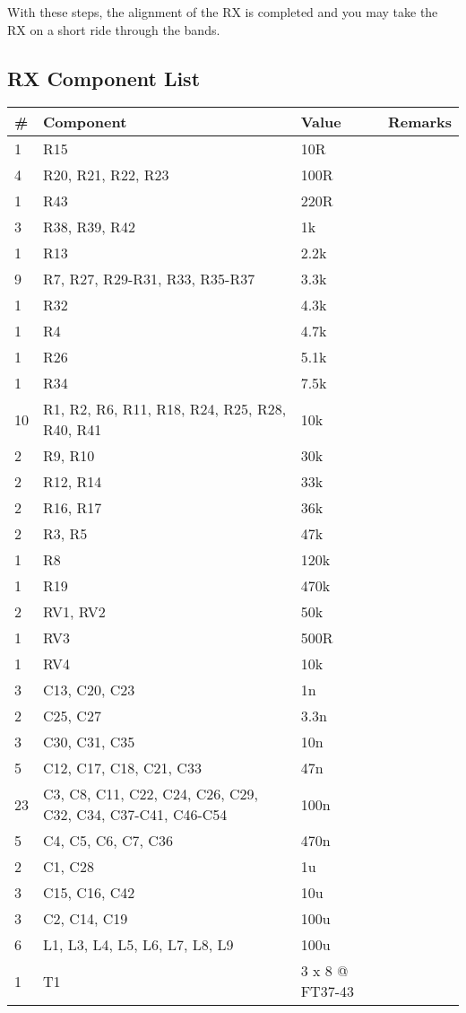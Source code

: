 \documentclass[10pt, a4paper]{scrartcl}
\begin{document}
With these steps, the alignment of the RX is completed and you may take the RX on a short ride through the bands.


\subsection{RX Component List}  \label{sec:rxcomp}
\begin{longtable}{|l|p{6cm}|l|l|} \hline 
\# & Component & Value & Remarks \\ \hline 
1 & R15 & 10R & \\
4 & R20, R21, R22, R23 & 100R & \\
1 & R43 & 220R & \\
3 & R38, R39, R42 & 1k & \\
1 & R13 & 2.2k & \\
9 & R7, R27, R29-R31, R33, R35-R37 & 3.3k & \\
1 & R32 & 4.3k & \\
1 & R4 & 4.7k & \\
1 & R26 & 5.1k & \\
1 & R34 & 7.5k & \\
10 & R1, R2, R6, R11, R18, R24, R25, R28, R40, R41 & 10k & \\
2 & R9, R10 & 30k & \\
2 & R12, R14 & 33k & \\
2 & R16, R17 & 36k & \\
2 & R3, R5 & 47k & \\
1 & R8 & 120k & \\
1 & R19 & 470k & \\
2 & RV1, RV2 & 50k & \\
1 & RV3 & 500R & \\
1 & RV4 & 10k & \\
3 & C13, C20, C23 & 1n & \\
2 & C25, C27 & 3.3n & \\
3 & C30, C31, C35 & 10n & \\
5 & C12, C17, C18, C21, C33 & 47n & \\
23 & C3, C8, C11, C22, C24, C26, C29, C32, C34, C37-C41, C46-C54 & 100n & \\
5 & C4, C5, C6, C7, C36 & 470n & \\
2 & C1, C28 & 1u & \\
3 & C15, C16, C42 & 10u & \\
3 & C2, C14, C19 & 100u & \\
6 & L1, L3, L4, L5, L6, L7, L8, L9 & 100u & \\
1 & T1 & 3 x 8 @ FT37-43 & \\

\end{longtable}
\end{document}
